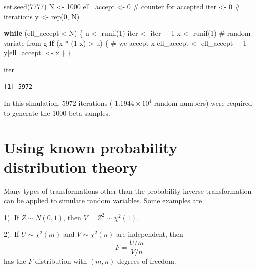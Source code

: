 \documentclass[
  letterpaper,
  DIV=11,
  numbers=noendperiod]{scrreprt}
\newenvironment{Shaded}{\begin{snugshade}}{\end{snugshade}}
\newcommand{\CommentTok}[1]{\textcolor[rgb]{0.37,0.37,0.37}{#1}}
\newcommand{\ControlFlowTok}[1]{\textcolor[rgb]{0.00,0.23,0.31}{\textbf{#1}}}
\newcommand{\DecValTok}[1]{\textcolor[rgb]{0.68,0.00,0.00}{#1}}
\newcommand{\FunctionTok}[1]{\textcolor[rgb]{0.28,0.35,0.67}{#1}}
\newcommand{\NormalTok}[1]{\textcolor[rgb]{0.00,0.23,0.31}{#1}}
\newcommand{\OtherTok}[1]{\textcolor[rgb]{0.00,0.23,0.31}{#1}}
\newcommand{\SpecialCharTok}[1]{\textcolor[rgb]{0.37,0.37,0.37}{#1}}
\begin{document}
\begin{Shaded}
\begin{Highlighting}[]
\FunctionTok{set.seed}\NormalTok{(}\DecValTok{7777}\NormalTok{)}
\NormalTok{N }\OtherTok{\textless{}{-}} \DecValTok{1000}
\NormalTok{ell\_accept }\OtherTok{\textless{}{-}} \DecValTok{0}       \CommentTok{\# counter for accepted}
\NormalTok{iter }\OtherTok{\textless{}{-}} \DecValTok{0}       \CommentTok{\# iterations}
\NormalTok{y }\OtherTok{\textless{}{-}} \FunctionTok{rep}\NormalTok{(}\DecValTok{0}\NormalTok{, N)}

\ControlFlowTok{while}\NormalTok{ (ell\_accept }\SpecialCharTok{\textless{}}\NormalTok{ N) \{}
\NormalTok{  u }\OtherTok{\textless{}{-}} \FunctionTok{runif}\NormalTok{(}\DecValTok{1}\NormalTok{)}
\NormalTok{  iter }\OtherTok{\textless{}{-}}\NormalTok{ iter }\SpecialCharTok{+} \DecValTok{1}
\NormalTok{  x }\OtherTok{\textless{}{-}} \FunctionTok{runif}\NormalTok{(}\DecValTok{1}\NormalTok{)   }\CommentTok{\# random variate from g}
  \ControlFlowTok{if}\NormalTok{ (x }\SpecialCharTok{*}\NormalTok{ (}\DecValTok{1}\SpecialCharTok{{-}}\NormalTok{x) }\SpecialCharTok{\textgreater{}}\NormalTok{ u) \{}
    \CommentTok{\# we accept x}
\NormalTok{    ell\_accept }\OtherTok{\textless{}{-}}\NormalTok{ ell\_accept }\SpecialCharTok{+} \DecValTok{1}
\NormalTok{    y[ell\_accept] }\OtherTok{\textless{}{-}}\NormalTok{ x}
\NormalTok{  \}}
\NormalTok{\}}

\NormalTok{iter}
\end{Highlighting}
\end{Shaded}

\begin{verbatim}
[1] 5972
\end{verbatim}

In this simulation, 5972 iterations ( \ensuremath{1.1944\times 10^{4}}
random numbers) were required to generate the 1000 beta samples.

\section{Using known probability distribution
theory}\label{using-known-probability-distribution-theory}

Many types of transformations other than the probability inverse
transformation can be applied to simulate random variables. Some
examples are

1). If \(Z \sim N(0,1)\), then \(V = Z^2 \sim \chi^2(1)\).

2). If \(U \sim \chi^2(m)\) and \(V \sim \chi^2(n)\) are independent,
then \[
  F = \frac{U/m}{V/n}
  \] has the \(F\) distribution with \((m,n)\) degrees of freedom.
\end{document}
